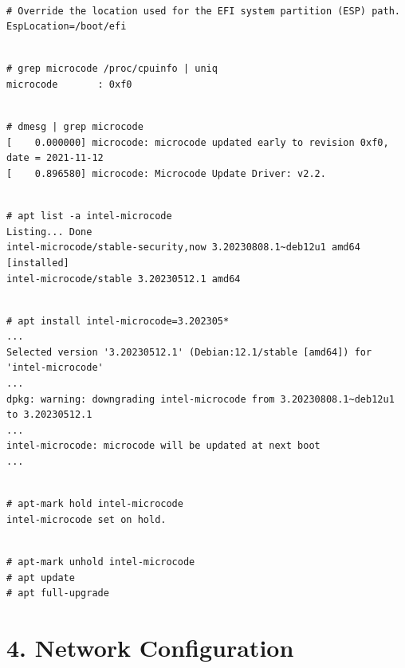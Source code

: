 \begin{lstlisting}

# Override the location used for the EFI system partition (ESP) path.
EspLocation=/boot/efi

\end{lstlisting}

\begin{lstlisting}

# grep microcode /proc/cpuinfo | uniq
microcode       : 0xf0

\end{lstlisting}

\begin{lstlisting}

# dmesg | grep microcode
[    0.000000] microcode: microcode updated early to revision 0xf0, date = 2021-11-12
[    0.896580] microcode: Microcode Update Driver: v2.2.

\end{lstlisting}

\begin{lstlisting}

# apt list -a intel-microcode
Listing... Done
intel-microcode/stable-security,now 3.20230808.1~deb12u1 amd64 [installed]
intel-microcode/stable 3.20230512.1 amd64

\end{lstlisting}

\begin{lstlisting}

# apt install intel-microcode=3.202305*
...
Selected version '3.20230512.1' (Debian:12.1/stable [amd64]) for 'intel-microcode'
...
dpkg: warning: downgrading intel-microcode from 3.20230808.1~deb12u1 to 3.20230512.1
...
intel-microcode: microcode will be updated at next boot
...

\end{lstlisting}

\begin{lstlisting}

# apt-mark hold intel-microcode
intel-microcode set on hold.

\end{lstlisting}

\begin{lstlisting}

# apt-mark unhold intel-microcode
# apt update
# apt full-upgrade

\end{lstlisting}


\section{4. Network Configuration}

